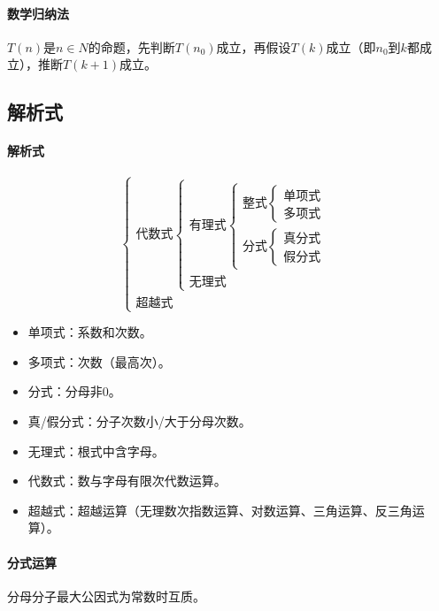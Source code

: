 \documentclass[
12pt, %
a4paper, 
oneside, %
]{scrartcl}
\begin{document}
\paragraph{数学归纳法}
$ T(n) $是$ n \in N $的命题，先判断$ T(n_0) $成立，再假设$ T(k) $成立（即$ n_0 $到$ k $都成立），推断$ T(k + 1) $成立。
\subsection[解析式]{解析式}
\paragraph{解析式}
$$ \begin{cases} \text{代数式} \begin{cases} \text{有理式} \begin{cases} \text{整式} \begin{cases} \text{单项式} \\ \text{多项式} \end{cases} \\ \text{分式} \begin{cases} \text{真分式} \\ \text{假分式} \end{cases} \end{cases} \\ \text{无理式} \end{cases} \\ \text{超越式} \end{cases} $$
\begin{itemize}
\item 单项式：系数和次数。
\item 多项式：次数（最高次）。
\item 分式：分母非$ 0 $。
\item 真/假分式：分子次数小/大于分母次数。
\item 无理式：根式中含字母。
\item 代数式：数与字母有限次代数运算。
\item 超越式：超越运算（无理数次指数运算、对数运算、三角运算、反三角运算）。
\end{itemize}
\paragraph{分式运算}
分母分子最大公因式为常数时互质。
\end{document}
